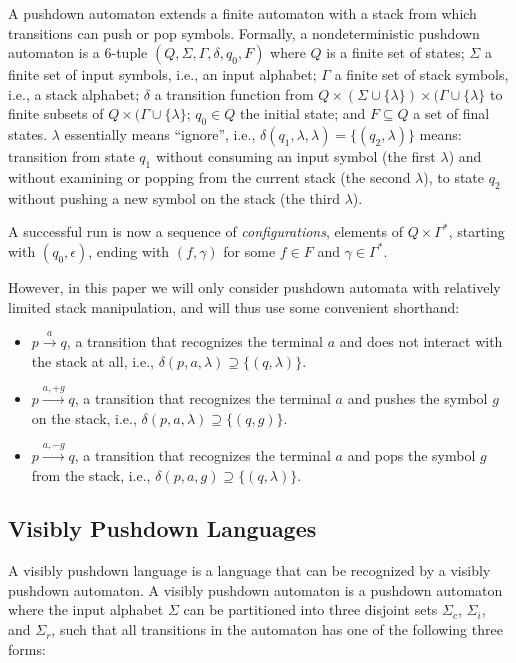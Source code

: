 \documentclass[acmsmall,review,anonymous]{acmart}\settopmatter{printfolios=true,printccs=false,printacmref=false}
\newcommand{\T}{\Sigma} %
\begin{document}
A pushdown automaton extends a finite automaton with a stack from which transitions can push or pop symbols. Formally, a nondeterministic pushdown automaton is a 6-tuple $(Q, \T, \Gamma, \delta, q_0, F)$ where $Q$ is a finite set of states; $\T$ a finite set of input symbols, i.e., an input alphabet; $\Gamma$ a finite set of stack symbols, i.e., a stack alphabet; $\delta$ a transition function from $Q \times (\T \cup \{\lambda\}) \times (\Gamma \cup \{\lambda\}$ to finite subsets of $Q \times (\Gamma \cup \{\lambda\}$; $q_0 \in Q$ the initial state; and $F \subseteq Q$ a set of final states. $\lambda$ essentially means ``ignore'', i.e., $\delta(q_1, \lambda, \lambda) = \{(q_2, \lambda)\}$ means: transition from state $q_1$ without consuming an input symbol (the first $\lambda$) and without examining or popping from the current stack (the second $\lambda$), to state $q_2$ without pushing a new symbol on the stack (the third $\lambda$).

A successful run is now a sequence of \emph{configurations}, elements of $Q \times \Gamma^{*}$, starting with $(q_0, \epsilon)$, ending with $(f, \gamma)$ for some $f \in F$ and $\gamma \in \Gamma^{*}$.

However, in this paper we will only consider pushdown automata with relatively limited stack manipulation, and will thus use some convenient shorthand:

\begin{itemize}
\item $p \xrightarrow{a} q$, a transition that recognizes the terminal $a$ and does not interact with the stack at all, i.e., $\delta(p, a, \lambda) \supseteq \{(q, \lambda)\}$.
\item $p \xrightarrow{a, +g} q$, a transition that recognizes the terminal $a$ and pushes the symbol $g$ on the stack, i.e., $\delta(p, a, \lambda) \supseteq \{(q, g)\}$.
\item $p \xrightarrow{a, -g} q$, a transition that recognizes the terminal $a$ and pops the symbol $g$ from the stack, i.e., $\delta(p, a, g) \supseteq \{(q, \lambda)\}$.
\end{itemize}

\subsection{Visibly Pushdown Languages} \label{sec:preliminaries-vpls}

A visibly pushdown language \cite{alurVisiblyPushdownLanguages2004} is a language that can be recognized by a visibly pushdown automaton. A visibly pushdown automaton is a pushdown automaton where the input alphabet $\T$ can be partitioned into three disjoint sets $\T_c$, $\T_i$, and $\T_r$, such that all transitions in the automaton has one of the following three forms:
\end{document}
